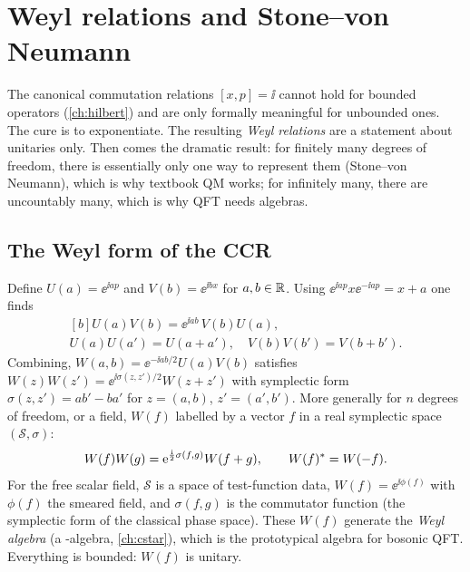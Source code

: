 \section{Weyl relations and Stone--von Neumann}\label{ch:weyl}
\skippable

\begin{physmotiv}
The canonical commutation relations $[x,p]=\ii$ cannot hold for bounded operators (\cref{ch:hilbert}) and are only formally meaningful for unbounded ones. The cure is to exponentiate. The resulting \emph{Weyl relations} are a statement about unitaries only. Then comes the dramatic result: for finitely many degrees of freedom, there is essentially only one way to represent them (Stone--von Neumann), which is why textbook QM works; for infinitely many, there are uncountably many, which is why QFT needs algebras.
\end{physmotiv}

\subsection{The Weyl form of the CCR}

Define $U(a)=\ee^{\ii ap}$ and $V(b)=\ee^{\ii bx}$ for $a,b\in\mathbb{R}$. Using $\ee^{\ii ap}x\ee^{-\ii ap}=x+a$ one finds
\begin{equation}
\begin{gathered}[b]U(a)V(b)=\ee^{\ii ab}\,V(b)U(a),\\ U(a)U(a')=U(a+a'),\quad V(b)V(b')=V(b+b').\end{gathered}\label{eq:weyl}
\end{equation}
Combining, $W(a,b)=\ee^{-\ii ab/2}U(a)V(b)$ satisfies $W(z)W(z')=\ee^{\ii\sigma(z,z')/2}W(z+z')$ with symplectic form $\sigma(z,z')=ab'-ba'$ for $z=(a,b)$, $z'=(a',b')$. More generally for $n$ degrees of freedom, or a field, $W(f)$ labelled by a vector $f$ in a real symplectic space $(\mathcal S,\sigma)$:
\begin{equation}
W(f)W(g)=\mathrm{e}^{\frac{\mathrm{i}}2\sigma(f,g)}W(f+g),\qquad W(f)^{*}=W(-f).
\end{equation}
For the free scalar field, $\mathcal S$ is a space of test-function data, $W(f)=\ee^{\ii\phi(f)}$ with $\phi(f)$ the smeared field, and $\sigma(f,g)$ is the commutator function (the symplectic form of the classical phase space). These $W(f)$ generate the \emph{Weyl algebra} (a \cstar-algebra, \cref{ch:cstar}), which is the prototypical algebra for bosonic QFT. Everything is bounded: $W(f)$ is unitary.

